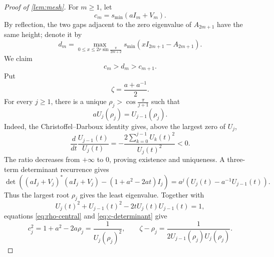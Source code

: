 \documentclass[review,hidelinks,onefignum,onetabnum]{siamart251216}
\begin{document}
\begin{proof}[Proof of \cref{lem:mesh}]
For \(m\geq1\), let
\begin{equation}\label{eq:c-height-def}
 c_m=s_{\min}(aI_m+V_m).
\end{equation}
By reflection, the two gaps adjacent to the zero eigenvalue of
\(A_{2m+1}\) have the same height; denote it by
\begin{equation}\label{eq:d-height-def}
 d_m=\max_{0\leq x\leq2r\sin\frac{\pi}{2m+2}}
 s_{\min}(xI_{2m+1}-A_{2m+1}).
\end{equation}
We claim
\begin{equation}\label{eq:central-interlace}
 c_m>d_m>c_{m+1}.
\end{equation}
Put
\[
 \zeta=\frac{a+a^{-1}}2.
\]
For every \(j\geq1\), there is a unique
\(\rho_j>\cos\frac{\pi}{j+1}\) such that
\begin{equation}\label{eq:rho-central}
 aU_j(\rho_j)=U_{j-1}(\rho_j).
\end{equation}
Indeed, the Christoffel--Darboux identity gives, above the largest zero
of \(U_j\),
\[
 \frac{d}{dt}\frac{U_{j-1}(t)}{U_j(t)}
 =-\frac{2\sum_{k=0}^{j-1}U_k(t)^2}{U_j(t)^2}<0.
\]
The ratio decreases from \(+\infty\) to \(0\), proving existence and
uniqueness.  A three-term determinant recurrence gives
\begin{equation}\label{eq:c-determinant}
 \det\left((aI_j+V_j)^*(aI_j+V_j)
 -(1+a^2-2at)I_j\right)
 =a^j\left(U_j(t)-a^{-1}U_{j-1}(t)\right).
\end{equation}
Thus the largest root \(\rho_j\) gives the least eigenvalue.  Together
with
\[
 U_j(t)^2+U_{j-1}(t)^2-2tU_j(t)U_{j-1}(t)=1,
\]
equations \eqref{eq:rho-central} and \eqref{eq:c-determinant} give
\begin{equation}\label{eq:c-rho-identities}
 c_j^2=1+a^2-2a\rho_j=\frac1{U_j(\rho_j)^2},\qquad
 \zeta-\rho_j=\frac1{2U_{j-1}(\rho_j)U_j(\rho_j)}.
\end{equation}


\end{proof}
\end{document}
